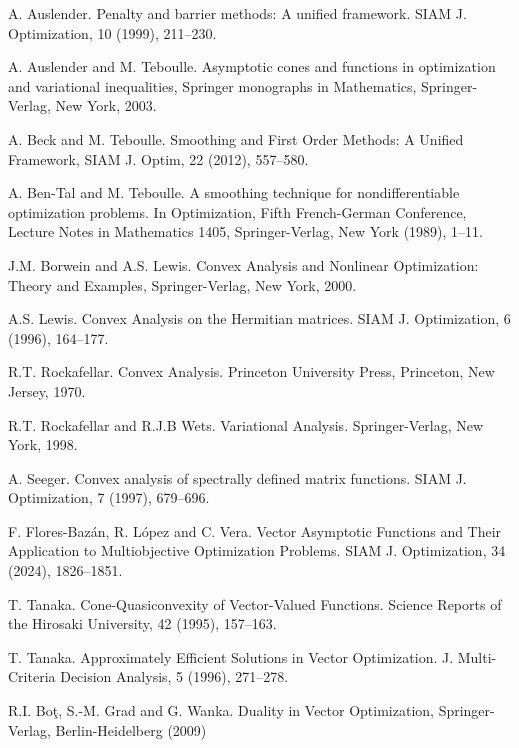\documentclass[a4paper,11pt]{jsarticle}
\theoremstyle{definition}
\begin{document}
\begin{thebibliography}{99}
    A. Auslender. Penalty and barrier methods: A unified framework. SIAM J. Optimization, 10 (1999), 211--230.

  A. Auslender and M. Teboulle. Asymptotic cones and functions in optimization and variational inequalities, Springer monographs in Mathematics, Springer-Verlag, New York, 2003.

  A. Beck and M. Teboulle. Smoothing and First Order Methods: A Unified Framework, SIAM J. Optim, 22 (2012), 557--580.

  A. Ben-Tal and M. Teboulle. A smoothing technique for nondifferentiable optimization problems. In Optimization, Fifth French-German Conference, Lecture Notes in Mathematics 1405, Springer-Verlag, New York (1989), 1--11.

  J.M. Borwein and A.S. Lewis. Convex Analysis and Nonlinear Optimization: Theory and Examples, Springer-Verlag, New York, 2000.

  A.S. Lewis. Convex Analysis on the Hermitian matrices. SIAM J. Optimization, 6 (1996), 164--177.

  R.T. Rockafellar. Convex Analysis. Princeton University Press, Princeton, New Jersey, 1970.

  R.T. Rockafellar and R.J.B Wets. Variational Analysis. Springer-Verlag, New York, 1998.

  A. Seeger. Convex analysis of spectrally defined matrix functions. SIAM J. Optimization, 7 (1997), 679--696.

  F. Flores-Baz\'{a}n, R. L\'{o}pez and C. Vera. Vector Asymptotic Functions and Their Application to Multiobjective Optimization Problems. SIAM J. Optimization, 34 (2024), 1826--1851.
  
  T. Tanaka. Cone-Quasiconvexity of Vector-Valued Functions. Science Reports of the Hirosaki University, 42 (1995), 157--163.

  T. Tanaka. Approximately Efficient Solutions in Vector Optimization. J. Multi-Criteria Decision Analysis, 5 (1996), 271--278.

  R.I. Bo\c{t}, S.-M. Grad and G. Wanka. Duality in Vector Optimization, Springer-Verlag, Berlin-Heidelberg (2009)
\end{thebibliography}
\end{document}
